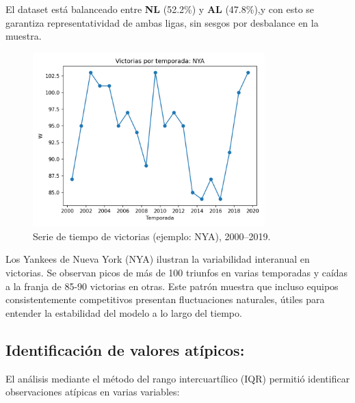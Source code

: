 \documentclass[man,floatsintext]{apa7}
\begin{document}
El dataset está balanceado entre \textbf{NL} (52.2\%) y \textbf{AL} (47.8\%),y con esto se garantiza representatividad de ambas ligas, sin sesgos por desbalance en la muestra.

\begin{figure}[H]
    \centering
    \includegraphics[width=0.8\textwidth]{../plots/ts_W_NYA.png}
    \caption{Serie de tiempo de victorias (ejemplo: NYA), 2000--2019.}
\end{figure}

Los Yankees de Nueva York (NYA) ilustran la variabilidad interanual en victorias. 
Se observan picos de más de 100 triunfos en varias temporadas y caídas a la franja de 85-90 victorias en otras. 
Este patrón muestra que incluso equipos consistentemente competitivos presentan fluctuaciones naturales, útiles para entender la estabilidad del modelo a lo largo del tiempo.

\subsection{Identificación de valores atípicos:}

El análisis mediante el método del rango intercuartílico (IQR) permitió identificar observaciones atípicas en varias variables:
\end{document}
